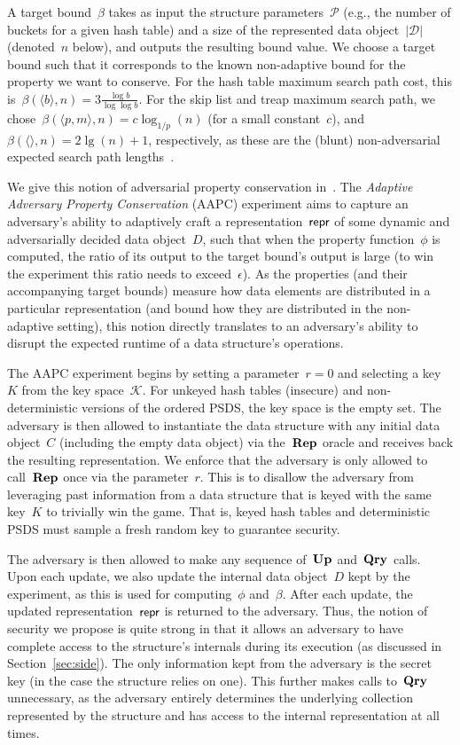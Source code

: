A target bound~$\beta$ takes as input the structure parameters~$\mathcal{P}$ (e.g., the number of buckets for a given hash table) and a size of the represented data object~$|\mathcal{D}|$ (denoted~$n$ below), and outputs the resulting bound value. We choose a target bound such that it corresponds to the known non-adaptive bound for the property we want to conserve. For the hash table maximum search path cost, this is~$\beta(\langle b \rangle, n) = 3\frac{\log b}{\log \log b}$. For the skip list and treap maximum search path, we chose~$\beta (\langle p,m \rangle, n) = c \log_{1/p}(n)$ (for a small constant~$c$), and $\beta (\langle  \rangle, n) = 2\lg(n)+1$, respectively, as these are the (blunt) non-adversarial expected search path lengths~\cite{pugh,reingold1994randomized}.

We give this notion of adversarial property conservation in~. The \emph{Adaptive Adversary Property Conservation} (AAPC) experiment aims to capture an adversary's ability to adaptively craft a representation~$\mathsf{repr}$ of some dynamic and adversarially decided data object~$D$, such that when the property function~$\phi$ is computed, the ratio of its output to the target bound's output is large (to win the experiment this ratio needs to exceed~$\epsilon$). As the properties (and their accompanying target bounds) measure how data elements are distributed in a particular representation (and bound how they are distributed in the non-adaptive setting), this notion directly translates to an adversary's ability to disrupt the expected runtime of a data structure's operations. 

The AAPC experiment begins by setting a parameter~$r=0$ and selecting a key~$K$ from the key space~$\mathcal{K}$. For unkeyed hash tables (insecure) and non-deterministic versions of the ordered PSDS, the key space is the empty set. The adversary is then allowed to instantiate the data structure with any initial data object~$C$ (including the empty data object) via the~$\textup{\textbf{Rep}}\hspace{0.5pt}$ oracle and receives back the resulting representation. We enforce that the adversary is only allowed to call~$\textup{\textbf{Rep}}\hspace{0.5pt}$ once via the parameter~$r$. This is to disallow the adversary from leveraging past information from a data structure that is keyed with the same key~$K$ to trivially win the game. That is, keyed hash tables and deterministic PSDS must sample a fresh random key to guarantee security. 

The adversary is then allowed to make any sequence of~$\textup{\textbf{Up}}\hspace{0.5pt}$ and~$\textup{\textbf{Qry}}\hspace{0.5pt}$ calls. Upon each update, we also update the internal data object~$D$ kept by the experiment, as this is used for computing~$\phi$ and~$\beta$. After each update, the updated representation~$\mathsf{repr}$ is returned to the adversary. Thus, the notion of security we propose is quite strong in that it allows an adversary to have complete access to the structure's internals during its execution (as discussed in Section~\ref{sec:side}). The only information kept from the adversary is the secret key (in the case the structure relies on one). This further makes calls to~$\textup{\textbf{Qry}}\hspace{0.5pt}$ unnecessary, as the adversary entirely determines the underlying collection represented by the structure and has access to the internal representation at all times. 


